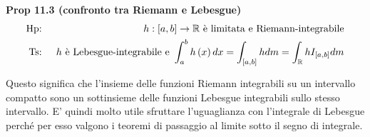 \documentclass{article}
\begin{document}
\textbf{Prop 11.3 (confronto tra Riemann e Lebesgue)}%
\begin{eqnarray*}
\text{Hp}\text{: } &&h:\left[ a,b\right] \rightarrow 
\mathbb{R}
\text{ \`{e} limitata e Riemann-integrabile} \\
\text{Ts}\text{: } &&h\text{ \`{e} Lebesgue-integrabile e }%
\int_{a}^{b}h\left( x\right) dx=\int_{\left[ a,b\right] }hdm=\int_{%
\mathbb{R}
}hI_{\left[ a,b\right] }dm
\end{eqnarray*}

Questo significa che l'insieme delle funzioni Riemann integrabili su un
intervallo compatto sono un sottinsieme delle funzioni Lebesgue integrabili
sullo stesso intervallo. E' quindi molto utile sfruttare l'uguaglianza con
l'integrale di Lebesgue perch\'{e} per esso valgono i teoremi di passaggio
al limite sotto il segno di integrale.
\end{document}
